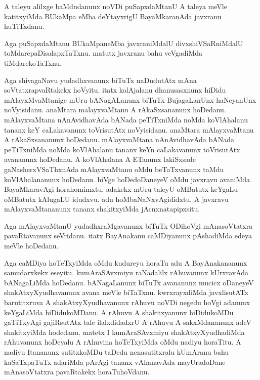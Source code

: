 \documentclass{article}
\begin{document}
\begin{mn}%
A taleyu alilxge baMdudanunx noVDi puSapxdaMtanU A taleya meVle katitxyiMda BUkaMpa eMba 
deYtayxrigU BayaMkaranAda javxranu huTiTxdanu.
\end{mn}

\begin{mn}%
Aga puSapxdaMtanu BUkaMpaneMba javxraniMdalU divxshiVSaRniMdalU toMdarepaDisalapxTaTxnu. 
matutx javxranu bahu veVgadiMda tiMdarekoTaTxnu.
\end{mn}

\begin{mn}%
Aga shivagaNavu yudadhxvanunx biTuTx naDudutAtx mAna soVtatxrapvaRtakekx hoVyitu. itatx 
kolAjalanu dhanusasxnunx hiDidu mAlayxMvaMtanige mUru bANagALanunx biTuTx BujagaLanUnx 
haNeyanUnx noVyisidanu. anaMtara malayxvaMtanu A rAkaSxsananunx hoDedanu. mAlayxvaMtana 
nAnAvidhavAda bANada peTiTxniMda noMda koVlAhalanu tananx keY caLakavanunx toVrisutAtx
noVyisidanu. anaMtara mAlayxvaMtanu A rAkaSxsananunx hoDedanu. mAlayxvaMtana nAnAvidhavAda 
bANada peTiTxniMda noMda koVlAhalanu tananx keYn caLakavanunx toVrisutAtx avananunx 
hoDedanu. A koVlAhalana A ETanunx lakiSxsade gaNasherxVSaThxnAda mAlayxvaMtanu oMdu 
beTaTxvanunx taMdu koVlAhalananunx hoDedanu. hiVge hoDedoDaneyeV oMdu javxravu avaniMda 
BayaMkaravAgi horahomimxtu. adakekx mUru taleyU oMBatutx keYgaLu oMBatutx kAlugaLU idudxvu. 
adu hoMbaNaNxvAgididxtu. A javxravu mAlayxvaMtananunx tananx shakitxyiMda jAcnxnatapipxsitu.
\end{mn}

\begin{mn}%
Aga mAlayxvaMtanU yudadhxraMgavanunx biTuTx ODihoVgi mAnasoVtatxra pavaRtavanunx seVridanu. 
itatx BayAnakanu caMDiyanunx pAshadiMda edeya meVle hoDedanu.
\end{mn}


\begin{mn}%
Aga caMDiya hoTeTxyiMda oMdu kudureyu horaTu adu A BayAnakananunx samudarxkekx eseyitu. 
kumAraSAvxmiyu raNadalilx rAhuvanunx kUrxravAda bANagaLiMda hoDedanu. bANagaLanunx biTuTx 
avananunx mucicx oDaneyeV shakAtxyXyudhavanunx avana meVle biTaTxnu. kwrxrayxdiMda 
javxlisutATx barutitxruva A shakAtxyXyudhavanunx rAhuvu noVDi negedu hoVgi adanunx 
keYgaLiMda hiDidukoMDanu. A rAhuvu A shakitxyanunx hiDidukoMDu gaTiTxyAgi gajiRsutAtx 
tale ilalxdidadxrU A rAhuvu A sakxMdananunx adeV shakitxyiMda hodedanu. matetx I 
kumAraSAvxmiyu shakAtxyXyudhadiMda rAhuvanunx hoDeyalu A rAhuvina hoTeTxyiMda oMdu nadiyu 
horaTitu. A nadiyu Itananunx sutitxkoMDu taDedu nenasutitxralu kUmAranu bahu kaSaTxpaTuTx 
adariMda pArAgi tananx vAhanavAda mayUradoDane mAnasoVtatxra pavaRtakekx horaTuhoVdanu.
\end{mn}
\end{document}
